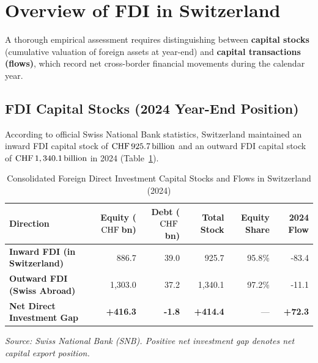 
\section{Overview of FDI in Switzerland}

A thorough empirical assessment requires distinguishing between \textbf{capital stocks} (cumulative valuation of foreign assets at year-end) and \textbf{capital transactions (flows)}, which record net cross-border financial movements during the calendar year.

\subsection{FDI Capital Stocks (2024 Year-End Position)}

According to official Swiss National Bank statistics, Switzerland maintained an inward FDI capital stock of \textbf{$\text{CHF}\,925.7\,\text{billion}$} and an outward FDI capital stock of \textbf{$\text{CHF}\,1,340.1\,\text{billion}$} in 2024 (Table~\ref{tab:fdi_overview_2024}).

\begin{table}[H]
\centering
\small
\caption{Consolidated Foreign Direct Investment Capital Stocks and Flows in Switzerland (2024)}
\label{tab:fdi_overview_2024}
\renewcommand{\arraystretch}{1.15}
\begin{tabularx}{\textwidth}{>{\raggedright\arraybackslash}X r r r r r}
\toprule
\rowcolor{tableheadbg}
\textbf{Direction} & \textbf{Equity ($\text{CHF}$\,bn)} & \textbf{Debt ($\text{CHF}$\,bn)} & \textbf{Total Stock} & \textbf{Equity Share} & \textbf{2024 Flow} \\
\midrule
\textbf{Inward FDI (in Switzerland)} & 886.7 & 39.0 & 925.7 & 95.8\% & -83.4 \\
\rowcolor{tablerowbg}
\textbf{Outward FDI (Swiss Abroad)} & 1,303.0 & 37.2 & 1,340.1 & 97.2\% & -11.1 \\
\midrule
\textbf{Net Direct Investment Gap} & \textbf{+416.3} & \textbf{-1.8} & \textbf{+414.4} & --- & \textbf{+72.3} \\
\bottomrule
\end{tabularx}
\par\vspace{0.3em}
\footnotesize
\textit{Source: Swiss National Bank (SNB). Positive net investment gap denotes net capital export position.}
\normalsize
\end{table}

